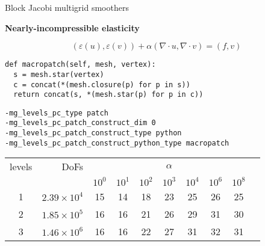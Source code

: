 \documentclass[paperwidth=60in,paperheight=36in,landscape]{baposter}
\begin{document}
\begin{poster}
\begin{posterbox}[name=introduction,span=2,column=0,row=0, height=1]{Block
      Jacobi multigrid smoothers}
    \vspace{1.75\baselineskip}
    {\centering\Large\bfseries Nearly-incompressible elasticity\par}
    \vspace{-0.75\baselineskip}
    \begin{equation*}
      (\varepsilon(u),\varepsilon(v)) + \alpha(\nabla \cdot u, \nabla
      \cdot v) = (f, v)
    \end{equation*}
    \begin{minipage}[t]{0.66\linewidth}
\begin{verbatim}
def macropatch(self, mesh, vertex):
  s = mesh.star(vertex)
  c = concat(*(mesh.closure(p) for p in s))
  return concat(s, *(mesh.star(p) for p in c))
\end{verbatim}
      \vspace{0pt}
\begin{verbatim}
-mg_levels_pc_type patch
-mg_levels_pc_patch_construct_dim 0
-mg_levels_pc_patch_construct_type python
-mg_levels_pc_patch_construct_python_type macropatch
\end{verbatim}
      \begin{tabular}{cr|cccccccc}
        \toprule
        levels & DoFs               & \multicolumn{7}{c}{$\alpha$}                                 \\
                  &                    & $10^0$ & $10^1$ & $10^2$ & $10^3$ & $10^4$ & $10^6$ & $10^8$ \\
        \midrule
        1         & $2.39 \times 10^4$ & 15       & 14   & 18     & 23     & 25     & 26     & 25     \\
        2         & $1.85\times 10^5$  & 16       & 16   & 21     & 26     & 29     & 31     & 30     \\
        3         & $1.46\times 10^6$  & 16       & 16   & 22     & 27     & 31     & 32     & 31     \\
        \bottomrule
      \end{tabular}
    \end{minipage}
    \hfill
    \begin{minipage}[t]{0.33\linewidth}
      \strut\vspace*{-\baselineskip}\newline
\end{minipage}
\end{posterbox}
\end{poster}
\end{document}
